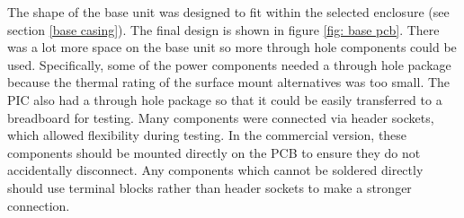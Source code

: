 The shape of the base unit was designed to fit within the selected enclosure (see section \ref{base casing}). The final design is shown in figure \ref{fig: base pcb}. There was a lot more space on the base unit so more through hole components could be used. Specifically, some of the power components needed a through hole package because the thermal rating of the surface mount alternatives was too small. The PIC also had a through hole package so that it could be easily transferred to a breadboard for testing. Many components were connected via header sockets, which allowed flexibility during testing. In the commercial version, these components should be mounted directly on the PCB to ensure they do not accidentally disconnect. Any components which cannot be soldered directly should use terminal blocks rather than header sockets to make a stronger connection. 